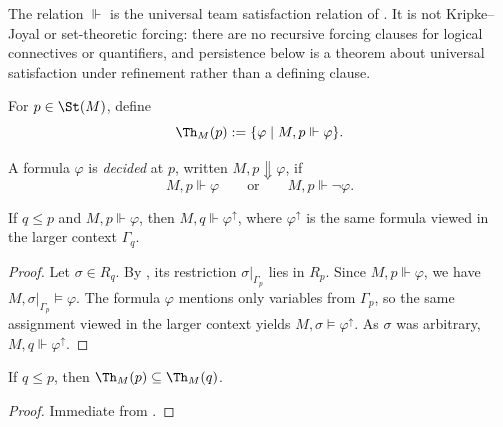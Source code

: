 \begin{remark}\label{rem:flat-forcing-convention}
The relation $\Vdash$ is the universal team satisfaction relation of
. It is not Kripke--Joyal or set-theoretic forcing:
there are no recursive forcing clauses for logical
connectives or quantifiers, and persistence below is a theorem about
universal satisfaction under refinement rather than a defining clause.
\end{remark}

\begin{definition}\label{def:state-theory}
For $p\in\St(M)$, define
\[
\Th_M(p):=\{\varphi\mid M,p\Vdash\varphi\}.
\]
\end{definition}

\begin{definition}[Decidedness]\label{def:decidedness}
A formula $\varphi$ is \emph{decided} at $p$, written $M,p\Downarrow\varphi$, if
\[
M,p\Vdash\varphi
\qquad\text{or}\qquad
M,p\Vdash\neg\varphi.
\]
\end{definition}

\begin{proposition}\label{prop:forcing-persistence}
If $q\le p$ and $M,p\Vdash\varphi$, then $M,q\Vdash\varphi^\uparrow$, where $\varphi^\uparrow$ is the same formula viewed in the larger context $\Gamma_q$.
\end{proposition}

\begin{proof}
Let $\sigma\in R_q$. By , its restriction $\sigma|_{\Gamma_p}$ lies in $R_p$. Since $M,p\Vdash\varphi$, we have $M,\sigma|_{\Gamma_p}\models\varphi$. The formula $\varphi$ mentions only variables from $\Gamma_p$, so the same assignment viewed in the larger context yields $M,\sigma\models\varphi^\uparrow$. As $\sigma$ was arbitrary, $M,q\Vdash\varphi^\uparrow$.
\end{proof}

\begin{corollary}\label{cor:state-theory-monotonicity}
If $q\le p$, then $\Th_M(p)\subseteq \Th_M(q)$.
\end{corollary}

\begin{proof}
Immediate from .
\end{proof}

